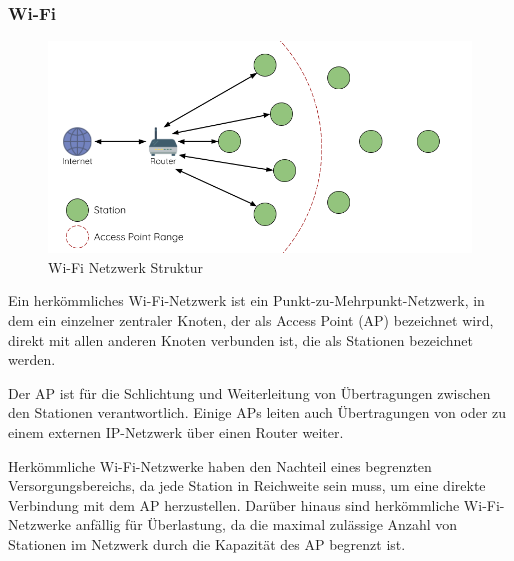 \subsubsection{Wi-Fi}

\begin{figure}[H] \begin{center}
    \includegraphics[scale=0.5]{diagrams/wifi-network-architecture.png}
    \caption{Wi-Fi Netzwerk Struktur \cite{esp-mesh}}
    \end{center}    
\end{figure}

Ein herkömmliches Wi-Fi-Netzwerk ist ein Punkt-zu-Mehrpunkt-Netzwerk, in dem ein einzelner zentraler Knoten, der als Access Point (AP) bezeichnet wird, direkt mit allen anderen Knoten verbunden ist, die als Stationen bezeichnet werden.

Der AP ist für die Schlichtung und Weiterleitung von Übertragungen zwischen den Stationen verantwortlich. Einige APs leiten auch Übertragungen von oder zu einem externen IP-Netzwerk über einen Router weiter.

Herkömmliche Wi-Fi-Netzwerke haben den Nachteil eines begrenzten Versorgungsbereichs, da jede Station in Reichweite sein muss, um eine direkte Verbindung mit dem AP herzustellen. Darüber hinaus sind herkömmliche Wi-Fi-Netzwerke anfällig für Überlastung, da die maximal zulässige Anzahl von Stationen im Netzwerk durch die Kapazität des AP begrenzt ist.

